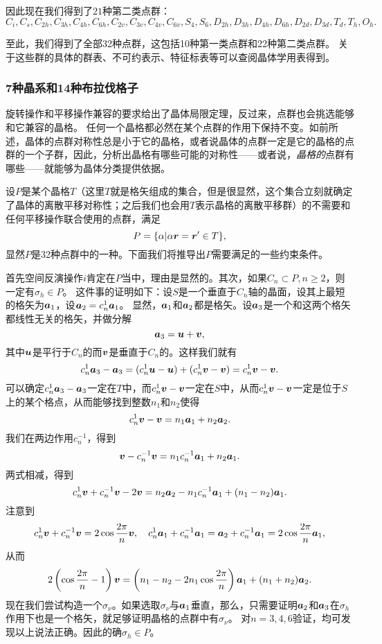 因此现在我们得到了$21$种第二类点群：
\[
    C_i, C_s, C_{2h}, C_{3h}, C_{4h}, C_{6h}, C_{2v}, C_{3v}, C_{4v}, C_{6v}, S_4, S_6, D_{2h}, D_{3h}, D_{4h}, D_{6h}, D_{2d}, D_{3d}, T_d, T_h, O_h.
\]

至此，我们得到了全部32种点群，这包括10种第一类点群和22种第二类点群。
关于这些群的具体的群表、不可约表示、特征标表等可以查阅晶体学用表得到。

\subsubsection{7种晶系和14种布拉伐格子}

旋转操作和平移操作兼容的要求给出了晶体局限定理，反过来，点群也会挑选能够和它兼容的晶格。
任何一个晶格都必然在某个点群的作用下保持不变。如前所述，晶体的点群对称性总是小于它的晶格，或者说晶体的点群一定是它的晶格的点群的一个子群，因此，分析出晶格有哪些可能的对称性——或者说，\emph{晶格的}点群有哪些——就能够为晶体分类提供依据。

设$P$是某个晶格$T$（这里$T$就是格矢组成的集合，但是很显然，这个集合立刻就确定了晶体的离散平移对称性；之后我们也会用$T$表示晶格的离散平移群）的不需要和任何平移操作联合使用的点群，满足
\begin{equation}
    P = \{ \alpha | \alpha \vb*{r} = \vb*{r}' \in T \},
\end{equation}
显然$P$是32种点群中的一种。下面我们将推导出$P$需要满足的一些约束条件。

首先空间反演操作$i$肯定在$P$当中，理由是显然的。其次，如果$C_n \subset P, n \geq 2$，则一定有$\sigma_h \in P$。
这件事的证明如下：设$S$是一个垂直于$C_n$轴的晶面，设其上最短的格矢为$\vb*{a}_1$，设$\vb*{a}_2 = c_n^1 \vb*{a}_1$。
显然，$\vb*{a}_1$和$\vb*{a}_2$都是格矢。设$\vb*{a}_3$是一个和这两个格矢都线性无关的格矢，并做分解
\[
    \vb*{a}_3 = \vb*{u} + \vb*{v},
\]
其中$\vb*{u}$是平行于$C_n$的而$\vb*{v}$是垂直于$C_n$的。这样我们就有
\[
    c_n^1 \vb*{a}_3 - \vb*{a}_3 = (c_n^1 \vb*{u} - \vb*{u}) + (c_n^1 \vb*{v} - \vb*{v}) = c_n^1 \vb*{v} - \vb*{v} .
\]
可以确定$c_n^1 \vb*{a}_3 - \vb*{a}_3$一定在$T$中，而$c_n^1 \vb*{v} - \vb*{v}$一定在$S$中，从而$c_n^1 \vb*{v} - \vb*{v}$一定是位于$S$上的某个格点，从而能够找到整数$n_1$和$n_2$使得
\[
    c_n^1 \vb*{v} - \vb*{v} = n_1 \vb*{a}_1 + n_2 \vb*{a}_2.
\]
我们在两边作用$c_n^{-1}$，得到
\[
    \vb*{v} - c_n^{-1} \vb*{v} = n_1 c_n^{-1} \vb*{a}_1 + n_2 \vb*{a}_1.
\]
两式相减，得到
\[
    c_n^1 \vb*{v} + c_n^{-1} \vb*{v} - 2 \vb*{v} = n_2 \vb*{a}_2 - n_1 c_n^{-1} \vb*{a}_1 + (n_1 - n_2) \vb*{a}_1.
\]
注意到
\[
    c_n^1 \vb*{v} + c_n^{-1} \vb*{v} = 2 \cos\frac{2\pi}{n} \vb*{v}, \quad c_n^1 \vb*{a}_1 + c_n^{-1} \vb*{a}_1 = \vb*{a}_2 + c_n^{-1} \vb*{a}_1 = 2 \cos\frac{2\pi}{n} \vb*{a}_1,
\]
从而
\begin{equation}
    2\left( \cos\frac{2\pi}{n} - 1 \right) \vb*{v} = \left( n_1 - n_2 - 2 n_1 \cos \frac{2\pi}{n} \right) \vb*{a}_1 + (n_1 + n_2) \vb*{a}_2.
\end{equation}
现在我们尝试构造一个$\sigma_\nu$。如果选取$\sigma_\nu$与$\vb*{a}_1$垂直，那么，只需要证明$\vb*{a}_2$和$\vb*{a}_3$在$\sigma_h$作用下也是一个格矢，就足够证明晶格的点群中有$\sigma_\nu$。
对$n=3, 4, 6$验证，均可发现以上说法正确。因此的确$\sigma_h \in P$。

